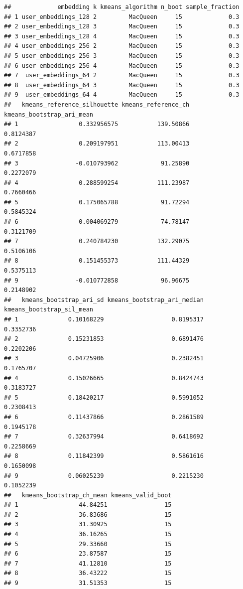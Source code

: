 \documentclass[
  11pt,
]{article}
\begin{document}
\begin{verbatim}
##             embedding k kmeans_algorithm n_boot sample_fraction
## 1 user_embeddings_128 2         MacQueen     15             0.3
## 2 user_embeddings_128 3         MacQueen     15             0.3
## 3 user_embeddings_128 4         MacQueen     15             0.3
## 4 user_embeddings_256 2         MacQueen     15             0.3
## 5 user_embeddings_256 3         MacQueen     15             0.3
## 6 user_embeddings_256 4         MacQueen     15             0.3
## 7  user_embeddings_64 2         MacQueen     15             0.3
## 8  user_embeddings_64 3         MacQueen     15             0.3
## 9  user_embeddings_64 4         MacQueen     15             0.3
##   kmeans_reference_silhouette kmeans_reference_ch kmeans_bootstrap_ari_mean
## 1                 0.332956575           139.50866                 0.8124387
## 2                 0.209197951           113.00413                 0.6717858
## 3                -0.010793962            91.25890                 0.2272079
## 4                 0.288599254           111.23987                 0.7660466
## 5                 0.175065788            91.72294                 0.5845324
## 6                 0.004069279            74.78147                 0.3121709
## 7                 0.240784230           132.29075                 0.5106106
## 8                 0.151455373           111.44329                 0.5375113
## 9                -0.010772858            96.96675                 0.2148902
##   kmeans_bootstrap_ari_sd kmeans_bootstrap_ari_median kmeans_bootstrap_sil_mean
## 1              0.10168229                   0.8195317                 0.3352736
## 2              0.15231853                   0.6891476                 0.2202206
## 3              0.04725906                   0.2382451                 0.1765707
## 4              0.15026665                   0.8424743                 0.3183727
## 5              0.18420217                   0.5991052                 0.2308413
## 6              0.11437866                   0.2861589                 0.1945178
## 7              0.32637994                   0.6418692                 0.2258669
## 8              0.11842399                   0.5861616                 0.1650098
## 9              0.06025239                   0.2215230                 0.1052239
##   kmeans_bootstrap_ch_mean kmeans_valid_boot
## 1                 44.84251                15
## 2                 36.83686                15
## 3                 31.30925                15
## 4                 36.16265                15
## 5                 29.33660                15
## 6                 23.87587                15
## 7                 41.12810                15
## 8                 36.43222                15
## 9                 31.51353                15
\end{verbatim}
\end{document}
